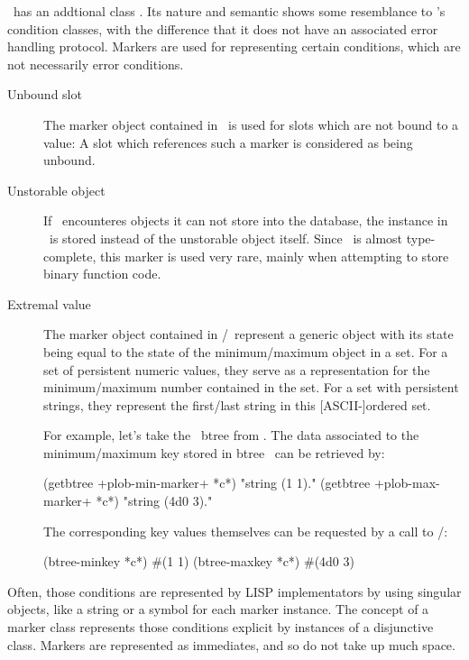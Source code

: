 \plob\ has an addtional class .  Its nature and semantic
shows some resemblance to \cl's condition classes, with the difference
that it does not have an associated error handling protocol.  Markers
are used for representing certain conditions, which are not
necessarily error conditions.
\begin{description}

\item[Unbound slot] The marker object contained in
  \ is used for slots which are not bound
  to a value: A slot which references such a marker is considered as
  being unbound.

\item[Unstorable object] If \plob\ encounteres objects it can not
  store into the database, the instance in
  \ is stored instead of the
  unstorable object itself. Since \plob\ is almost type-complete, this
  marker is used very rare, mainly when attempting to store binary
  function code.

\item[Extremal value] The marker object contained in
  /\ represent a
  generic object with its state being equal to the state of the
  minimum/maximum object in a set. For a set of persistent numeric
  values, they serve as a representation for the minimum/maximum
  number contained in the set. For a set with persistent strings, they
  represent the first/last string in this [ASCII-]ordered set.

  For example, let's take the \ btree from
  . The data associated to the
  minimum/maximum key stored in btree \ can be retrieved by:
  \begin{CompactCode}
\listener{}(getbtree +plob-min-marker+ *c*)
"string (1 1)."
\listener{}(getbtree +plob-max-marker+ *c*)
"string (4d0 3)."
  \end{CompactCode}
  The corresponding key values themselves can be requested by a call
  to /:
  \begin{CompactCode}
\listener{}(btree-minkey *c*)
#(1 1)
\listener{}(btree-maxkey *c*)
#(4d0 3)
  \end{CompactCode}

\end{description}
Often, those conditions are represented by LISP implementators by
using singular objects, like a string or a symbol for each marker
instance.  The concept of a marker class represents those conditions
explicit by instances of a disjunctive class. Markers are
represented as immediates, and so do not take up much space.

